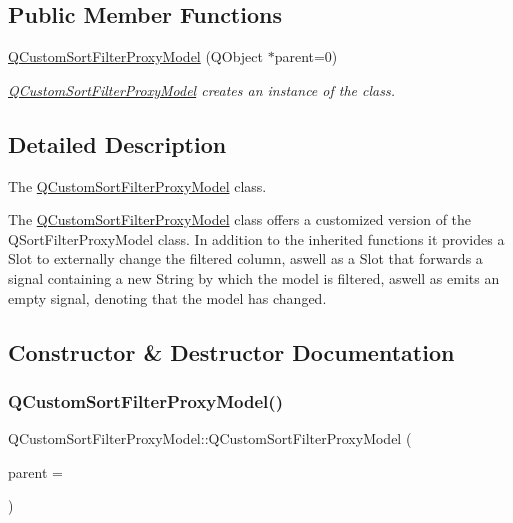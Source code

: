 \subsection*{Public Member Functions}
\begin{DoxyCompactItemize}
\item 
\mbox{\hyperlink{class_q_custom_sort_filter_proxy_model_aa51b6a64ce00d57682fa21baa5c62f9e}{Q\+Custom\+Sort\+Filter\+Proxy\+Model}} (Q\+Object $\ast$parent=0)
\begin{DoxyCompactList}\small\item\em \mbox{\hyperlink{class_q_custom_sort_filter_proxy_model}{Q\+Custom\+Sort\+Filter\+Proxy\+Model}} creates an instance of the class. \end{DoxyCompactList}\end{DoxyCompactItemize}


\subsection{Detailed Description}
The \mbox{\hyperlink{class_q_custom_sort_filter_proxy_model}{Q\+Custom\+Sort\+Filter\+Proxy\+Model}} class. 

The \mbox{\hyperlink{class_q_custom_sort_filter_proxy_model}{Q\+Custom\+Sort\+Filter\+Proxy\+Model}} class offers a customized version of the Q\+Sort\+Filter\+Proxy\+Model class. In addition to the inherited functions it provides a Slot to externally change the filtered column, aswell as a Slot that forwards a signal containing a new String by which the model is filtered, aswell as emits an empty signal, denoting that the model has changed. 

\subsection{Constructor \& Destructor Documentation}
\mbox{\label{class_q_custom_sort_filter_proxy_model_aa51b6a64ce00d57682fa21baa5c62f9e}} 
\subsubsection{\texorpdfstring{Q\+Custom\+Sort\+Filter\+Proxy\+Model()}{QCustomSortFilterProxyModel()}}
{\footnotesize\ttfamily Q\+Custom\+Sort\+Filter\+Proxy\+Model\+::\+Q\+Custom\+Sort\+Filter\+Proxy\+Model (\begin{DoxyParamCaption}\item[{Q\+Object $\ast$}]{parent = {} }\end{DoxyParamCaption})\hspace{0.3cm}{\ttfamily [explicit]}}



